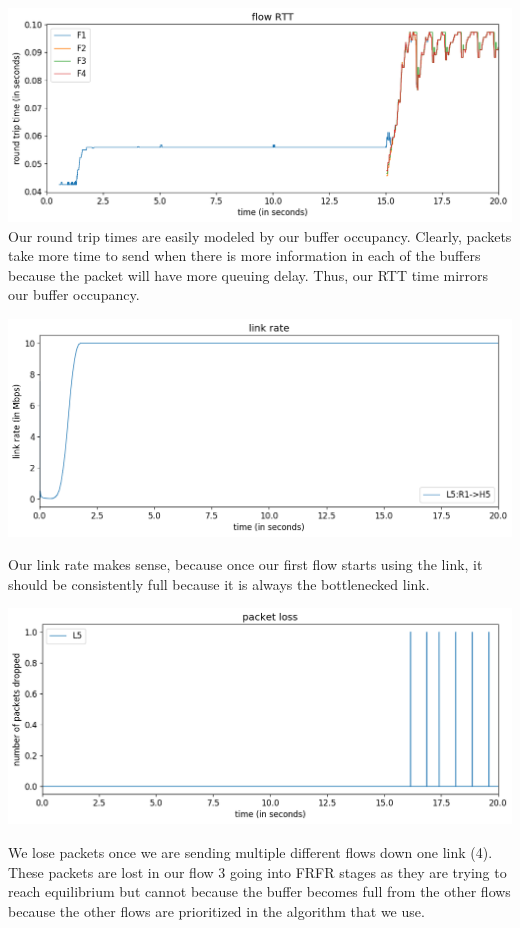 \documentclass{article}
\begin{document}
\includegraphics[width = \textwidth]{"test_case5_fast flow RTT"}
Our round trip times are easily modeled by our buffer occupancy. Clearly, packets take more time to send when there is more information in each of the buffers because the packet will have more queuing delay. Thus, our RTT time mirrors our buffer occupancy.

\includegraphics[width = \textwidth]{"test_case5_fast link rate"}

Our link rate makes sense, because once our first flow starts using the link, it should be consistently full because it is always the bottlenecked link.

\includegraphics[width = \textwidth]{"test_case5_fast packet loss"}

We lose packets once we are sending multiple different flows down one link (4). These packets are lost in our flow 3 going into FRFR stages as they are trying to reach equilibrium but cannot because the buffer becomes full from the other flows because the other flows are prioritized in the algorithm that we use.
\end{document}
